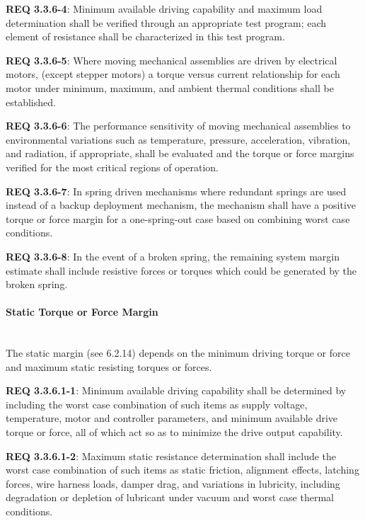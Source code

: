\documentclass[12pt]{article}
\begin{document}
\noindent \textbf{REQ 3.3.6-4}: Minimum available driving capability and maximum load determination shall be verified through an appropriate test program; each element of resistance shall be characterized in this test program. 

\noindent \textbf{REQ 3.3.6-5}: Where moving mechanical assemblies are driven by electrical motors, (except stepper motors) a torque versus current relationship for each motor under minimum, maximum, and ambient thermal conditions shall be established. 

\noindent \textbf{REQ 3.3.6-6}: The performance sensitivity of moving mechanical assemblies to environmental variations such as temperature, pressure, acceleration, vibration, and radiation, if appropriate, shall be evaluated and the torque or force margins verified for the most critical regions of operation.

\noindent \textbf{REQ 3.3.6-7}: In spring driven mechanisms where redundant springs are used instead of a backup deployment mechanism, the mechanism shall have a positive torque or force margin for a one-spring-out case based on combining worst case conditions. 

\noindent \textbf{REQ 3.3.6-8}: In the event of a broken spring, the remaining system margin estimate shall include resistive forces or torques which could be generated by the broken spring.


\paragraph{Static Torque or Force Margin} \mbox{} \\ %
The static margin (see 6.2.14) depends on the minimum driving torque or force and maximum static resisting torques or forces. 

\noindent \textbf{REQ 3.3.6.1-1}: Minimum available driving capability shall be determined by including the worst case combination of such items as supply voltage, temperature, motor and controller parameters, and minimum available drive torque or force, all of which act so as to minimize the drive output capability. 

\noindent \textbf{REQ 3.3.6.1-2}: Maximum static resistance determination shall include the worst case combination of such items as static friction, alignment effects, latching forces, wire harness loads, damper drag, and variations in lubricity, including degradation or depletion of lubricant under vacuum and worst case thermal conditions. 
\end{document}
